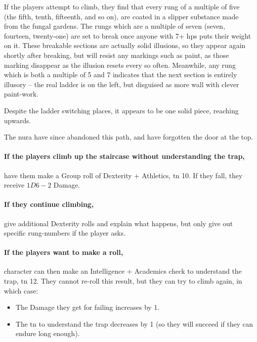 \begin{multicols}{2}
\begin{exampletext}
\end{exampletext}

If the players attempt to climb, they find that every rung of a multiple of five (the fifth, tenth, fifteenth, and so on), are coated in a slipper substance made from the fungal gardens.
The rungs which are a multiple of seven (seven, fourteen, twenty-one) are set to break once anyone with 7+ \glspl{hp} puts their weight on it.
These breakable sections are actually solid illusions, so they appear again shortly after breaking, but will resist any markings such as paint, as those marking disappear as the illusion resets every so often.
Meanwhile, any rung which is both a multiple of 5 and 7 indicates that the next section is entirely illusory -- the real ladder is on the left, but disguised as more wall with clever paint-work.

Despite the ladder switching places, it appears to be one solid piece, reaching upwards.

The nura have since abandoned this path, and have forgotten the door at the top.

\paragraph{If the players climb up the staircase without understanding the trap,}
have them make a Group roll of Dexterity + Athletics, \gls{tn} 10.%
If they fall, they receive $1D6-2$ Damage.

\paragraph{If they continue climbing,}
give additional Dexterity rolls and explain what happens, but only give out specific rung-numbers if the player asks.

\paragraph{If the players want to make a roll,}
character can then make an Intelligence + Academics check to understand the trap, \gls{tn} 12.
They cannot re-roll this result, but they can try to climb again, in which case:

\begin{itemize}

  \item
  The Damage they get for failing increases by 1.
  \item
  The \gls{tn} to understand the trap decreases by 1 (so they will succeed if they can endure long enough).


\end{itemize}
\end{multicols}
